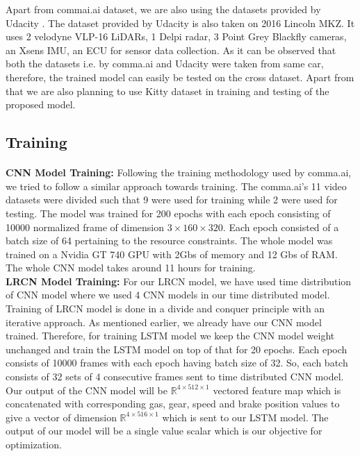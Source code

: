 \documentclass[a4paper,11pt,titlepage,drop]{article}%
\begin{document}
Apart from commai.ai dataset, we are also using the datasets provided by Udacity . The dataset provided by Udacity is also taken on 2016 Lincoln MKZ. It uses 2 velodyne VLP-16 LiDARs, 1 Delpi radar, 3 Point Grey Blackfly cameras, an Xsens IMU, an ECU for sensor data collection. As it can be observed that both the datasets i.e. by comma.ai and Udacity were taken from same car, therefore, the trained model can easily be tested on the cross dataset. Apart from that we are also planning to use Kitty dataset in training and testing of the proposed model. 

\subsection{Training} 
\paragraph{}
\textbf{CNN Model Training:} Following the training methodology used by comma.ai, we tried to follow a similar approach towards training. The comma.ai's 11 video datasets were divided such that 9 were used for training while 2 were used for testing. The model was trained for 200 epochs with each epoch consisting of 10000 normalized frame of dimension $3\times160\times320$. Each epoch consisted of a batch size of 64 pertaining to the resource constraints. The whole model was trained on a Nvidia GT 740 GPU with 2Gbs of memory and 12 Gbs of RAM. The whole CNN model takes around 11 hours for training.\\

\textbf{LRCN Model Training:} For our LRCN model, we have used time distribution of CNN model where we used 4 CNN models in our time distributed model. Training of LRCN model is done in a divide and conquer principle with an iterative approach. As mentioned earlier, we already have our CNN model trained. Therefore, for training LSTM model we keep the CNN model weight unchanged and train the LSTM model on top of that for 20 epochs. Each epoch consists of 10000 frames with each epoch having batch size of 32. So, each batch consists of 32 sets of 4 consecutive frames sent to time distributed CNN model. Our output of the CNN model will be $\mathbb{R}^{4\times512\times1}$  vectored feature map which is concatenated with corresponding gas, gear, speed and brake position values to give a vector of dimension $\mathbb{R}^{4\times516\times1}$ which is sent to our LSTM model. The output of our model will be a single value scalar which is our objective for optimization.\\
\end{document}
